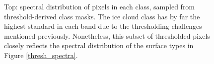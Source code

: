 \documentclass[12pt]{article}
\begin{document}
\begin{figure}[h!]
    \centering

    \begin{center}
    \end{center}

    \caption{Top: spectral distribution of pixels in each class, sampled from threshold-derived class masks. The ice cloud class has by far the highest standard in each band due to the thresholding challenges mentioned previously. Nonetheless, this subset of thresholded pixels closely reflects the spectral distribution of the surface types in Figure \ref{thresh_spectra}.}
    \label{samples_thresh_spectra}
\end{figure}

\clearpage
\end{document}

